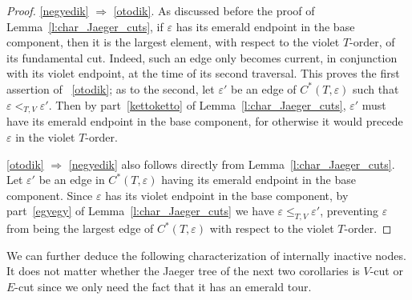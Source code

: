 \documentclass[10pt]{amsart}
\theoremstyle{definition}\newtheorem{defi}[theo]{Definition}
\theoremstyle{remark}\newtheorem{rema}[theo]{Remark}
\begin{document}
\begin{proof}

\ref{negyedik} $\Rightarrow$ \ref{otodik}. As discussed before the proof of Lemma~\ref{l:char_Jaeger_cuts}, if $\varepsilon$ has its emerald endpoint in the base component, then it is the largest element, with respect to the violet $T$-order, of its fundamental cut. Indeed, such an edge only becomes current, in conjunction with its violet endpoint, at the time of its second traversal. This proves the first assertion of ~\ref{otodik}; as to the second, let $\varepsilon'$ be an edge of $C^*(T,\varepsilon)$ such that $\varepsilon <_{T,V}\varepsilon'$. Then by part~\ref{kettoketto} of Lemma~\ref{l:char_Jaeger_cuts}, $\varepsilon'$ must have its emerald endpoint in the base component, for otherwise it would precede $\varepsilon$ in the violet $T$-order.


\ref{otodik} $\Rightarrow$ \ref{negyedik} also follows directly from Lemma~\ref{l:char_Jaeger_cuts}. Let $\varepsilon'$ be an edge in $C^*(T,\varepsilon)$ having its emerald endpoint in the base component. Since $\varepsilon$ has its violet endpoint in the base component, by part~\ref{egyegy} of Lemma~\ref{l:char_Jaeger_cuts} we have $\varepsilon \leq_{T,V} \varepsilon'$, preventing $\varepsilon$ from being the largest edge of $C^*(T,\varepsilon)$ with respect to the violet $T$-order.
\end{proof}

We can further deduce the following characterization of internally inactive nodes. It does not matter whether the Jaeger tree of the next two corollaries is $V$-cut or $E$-cut since we only need the fact that it has an emerald tour.
\end{document}
